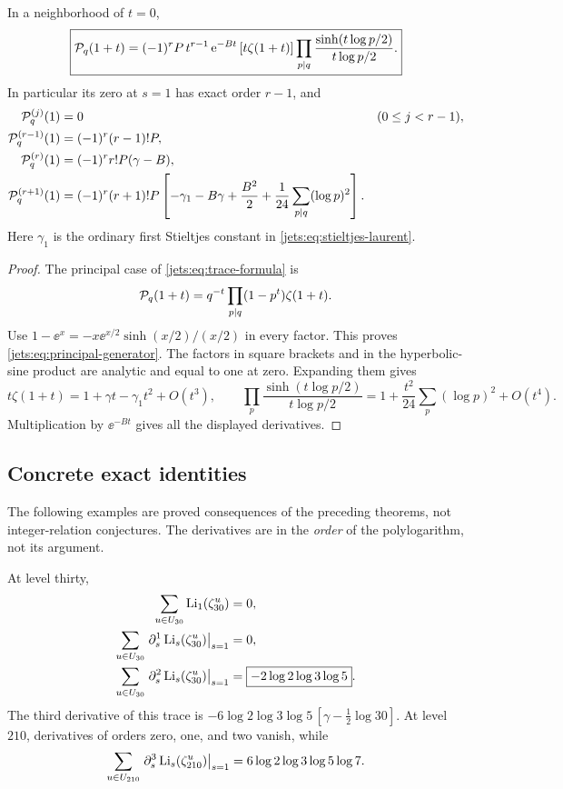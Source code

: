 \begin{theorem}\label{jets:thm:principal}
In a neighborhood of $t=0$,
\begin{equation}\label{jets:eq:principal-generator}
 \boxed{\displaystyle
 \mathcal P_q(1+t)=(-1)^rP\,t^{r-1}\,
 \mathrm e^{-Bt}\,[t\zeta(1+t)]
 \prod_{p\mid q}\frac{\sinh(t\log p/2)}{t\log p/2}.}
\end{equation}
In particular its zero at $s=1$ has exact order $r-1$, and
\begin{align}
 \mathcal P_q^{(j)}(1)&=0 &&(0\le j<r-1),\label{jets:eq:principal-vanish}\\
 \mathcal P_q^{(r-1)}(1)&=(-1)^r(r-1)!P,\label{jets:eq:principal-first}\\
 \mathcal P_q^{(r)}(1)&=(-1)^r r!P(\gamma-B),\label{jets:eq:principal-second}\\
 \mathcal P_q^{(r+1)}(1)&=(-1)^r(r+1)!P
 \left[-\gamma_1-B\gamma+\frac{B^2}{2}
 +\frac1{24}\sum_{p\mid q}(\log p)^2\right].
 \label{jets:eq:principal-third}
\end{align}
Here $\gamma_1$ is the ordinary first Stieltjes constant in
\eqref{jets:eq:stieltjes-laurent}.
\end{theorem}
\begin{proof}
The principal case of \eqref{jets:eq:trace-formula} is
\[
 \mathcal P_q(1+t)=q^{-t}\prod_{p\mid q}(1-p^t)\zeta(1+t).
\]
Use $1-\ee^x=-x\ee^{x/2}\sinh(x/2)/(x/2)$ in every factor.
This proves \eqref{jets:eq:principal-generator}.
The factors in square brackets and in the hyperbolic-sine product are
analytic and equal to one at zero. Expanding them gives
\[
 t\zeta(1+t)=1+\gamma t-\gamma_1t^2+O(t^3),\qquad
 \prod_p\frac{\sinh(t\log p/2)}{t\log p/2}
 =1+\frac{t^2}{24}\sum_p(\log p)^2+O(t^4).
\]
Multiplication by $\ee^{-Bt}$ gives all the displayed derivatives.
\end{proof}

\subsection{Concrete exact identities}
The following examples are proved consequences of the preceding
theorems, not integer-relation conjectures. The derivatives are in the
\emph{order} of the polylogarithm, not its argument.

At level thirty,
\begin{align}
 \sum_{u\in U_{30}}\operatorname{Li}_1(\zeta_{30}^u)&=0,\label{jets:eq:q30-zero}\\
 \sum_{u\in U_{30}}\left.\partial_s^{1}\operatorname{Li}_s(\zeta_{30}^u)\right|_{s=1}&=0,\label{jets:eq:q30-first}\\
 \sum_{u\in U_{30}}\left.\partial_s^{2}\operatorname{Li}_s(\zeta_{30}^u)\right|_{s=1}
 &=\boxed{-2\log2\log3\log5}.\label{jets:eq:q30-second}
\end{align}
The third derivative of this trace is
$-6\log2\log3\log5\,[\gamma-\frac12\log30]$.
At level $210$, derivatives of orders zero, one, and two vanish, while
\begin{equation}\label{jets:eq:q210}
 \sum_{u\in U_{210}}\left.\partial_s^{3}\operatorname{Li}_s(\zeta_{210}^u)\right|_{s=1}
 =6\log2\log3\log5\log7.
\end{equation}

